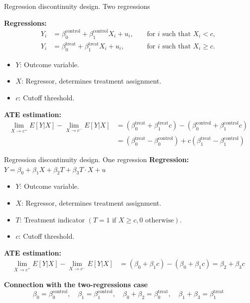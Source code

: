 \documentclass[aspectratio=169]{beamer}
\begin{document}
\begin{frame}{Regression discontinuity design. Two regressions}
    
    \textbf{Regressions:}
    \begin{align*}
        Y_i &= \beta_0^{\text{control}} + \beta_1^{\text{control}} X_i + u_i, && \text{ for } i \text{ such that } X_i < c, \\
        Y_i &= \beta_0^{\text{treat}} + \beta_1^{\text{treat}} X_i + u_i, && \text{ for } i \text{ such that } X_i \geq c.
    \end{align*}
    
    \begin{itemize}
        \item \( Y \): Outcome variable.
        \item \( X \): Regressor, determines treatment assignment.
        \item \( c \): Cutoff threshold.
    \end{itemize}
    \vspace{0.3cm}
    
    \textbf{ATE estimation:}
    \begin{align*}
        \lim_{X \to c^+} E[Y|X] - \lim_{X \to c^-} E[Y|X] 
        &= (\beta_0^{\text{treat}} + \beta_1^{\text{treat}} c) - (\beta_0^{\text{control}} + \beta_1^{\text{control}} c) \\
        &= (\beta_0^{\text{treat}} - \beta_0^{\text{control}}) + c(\beta_1^{\text{treat}} - \beta_1^{\text{control}})
    \end{align*}

\end{frame}

\begin{frame}{Regression discontinuity design. One regression}
    \textbf{Regression:}
    $
    Y = \beta_0 + \beta_1 X + \beta_2 T + \beta_3 T \cdot X + u
    $
    \begin{itemize}
        \item \( Y \): Outcome variable.
        \item \( X \): Regressor, determines treatment assignment.
        \item \( T \): Treatment indicator \( (T = 1 \text{ if } X \geq c, 0 \text{ otherwise}) \).
        \item \( c \): Cutoff threshold.
    \end{itemize}
    \vspace{0.3cm}
    
    \textbf{ATE estimation:}
    \begin{align*}
        \lim_{X \to c^+} E[Y|X] - \lim_{X \to c^-} E[Y|X] 
        &= (\beta_0 + \beta_1 c) - (\beta_0 + \beta_1 c) 
        = \beta_2 + \beta_3 c
    \end{align*}
    
    \textbf{Connection with the two-regressions case}
    $$
    \beta_0 = \beta_0^\text{control}, \quad \beta_1 = \beta_1^{\text{control}}, \quad \beta_0 + \beta_2 = \beta_0^\text{treat}, \quad \beta_1 + \beta_3 = \beta_1^{\text{treat}}
    $$
\end{frame}
\end{document}
